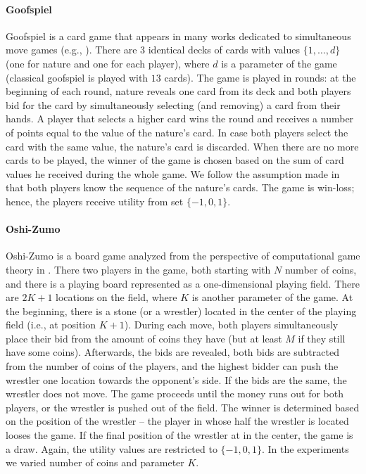 \paragraph{\textbf{Goofspiel}}
Goofspiel is a card game that appears in many works dedicated to simultaneous move games (e.g., \cite{Saffidine12SMAB,Rhoads12Computer,Lanctot13Goofspiel}). 
There are $3$ identical decks of cards with values $\{1,\dots, d\}$ (one for nature and one for each player), where $d$ is a parameter of the game (classical goofspiel is played with $13$ cards). 
The game is played in rounds: at the beginning of each round, nature reveals one card from its deck and both players bid for the card by simultaneously selecting (and removing) a card from their hands. 
A player that selects a higher card wins the round and receives a number of points equal to the value of the nature's card. In case both players select the card with the same value, the nature's card is discarded. 
When there are no more cards to be played, the winner of the game is chosen based on the sum of card values he received during the whole game. 
We follow the assumption made in \cite{Saffidine12SMAB} that both players know the sequence of the nature's cards. 
The game is win-loss; hence, the players receive utility from set $\lbrace -1, 0, 1 \rbrace$.

\paragraph{\textbf{Oshi-Zumo}}
Oshi-Zumo is a board game analyzed from the perspective of computational game theory in \cite{buro2003}.
There two players in the game, both starting with $N$ number of coins, and there is a playing board represented as a one-dimensional playing field. 
There are $2K+1$ locations on the field, where $K$ is another parameter of the game.
At the beginning, there is a stone (or a wrestler) located in the center of the playing field (i.e., at position $K+1$).
During each move, both players simultaneously place their bid from the amount of coins they have (but at least $M$ if they still have some coins).
Afterwards, the bids are revealed, both bids are subtracted from the number of coins of the players, and the highest bidder can push the wrestler one location towards the opponent's side.
If the bids are the same, the wrestler does not move. 
The game proceeds until the money runs out for both players, or the wrestler is pushed out of the field. 
The winner is determined based on the position of the wrestler -- the player in whose half the wrestler is located looses the game. 
If the final position of the wrestler at in the center, the game is a draw.
Again, the utility values are restricted to $\lbrace -1, 0, 1 \rbrace$.
In the experiments we varied number of coins and parameter $K$.

